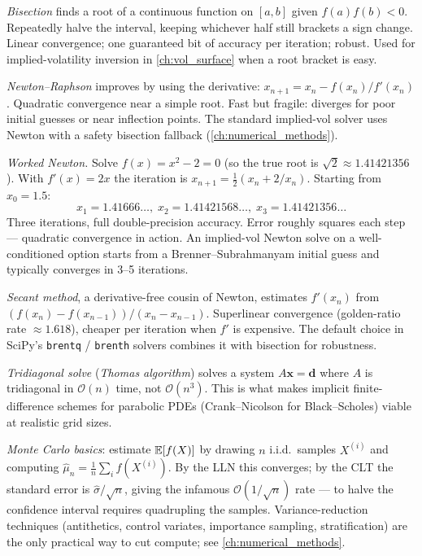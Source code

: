 \emph{Bisection} finds a root of a continuous function on $[a, b]$
given $f(a)f(b) < 0$. Repeatedly halve the interval, keeping whichever
half still brackets a sign change. Linear convergence; one guaranteed
bit of accuracy per iteration; robust. Used for implied-volatility
inversion in \cref{ch:vol_surface} when a root bracket is easy.

\emph{Newton--Raphson} improves by using the derivative:
$x_{n+1} = x_n - f(x_n) / f'(x_n)$. Quadratic convergence near a simple
root. Fast but fragile: diverges for poor initial guesses or near
inflection points. The standard implied-vol solver uses Newton with a
safety bisection fallback (\cref{ch:numerical_methods}).

\emph{Worked Newton.} Solve $f(x) = x^2 - 2 = 0$ (so the true root is
$\sqrt{2} \approx 1.41421356$). With $f'(x) = 2x$ the iteration is
$x_{n+1} = \tfrac{1}{2}(x_n + 2/x_n)$. Starting from $x_0 = 1.5$:
\[
x_1 = 1.41666\ldots,\; x_2 = 1.41421568\ldots,\; x_3 = 1.41421356\ldots
\]
Three iterations, full double-precision accuracy. Error roughly squares
each step --- quadratic convergence in action. An implied-vol
Newton solve on a well-conditioned option starts from a Brenner--Subrahmanyam
initial guess and typically converges in 3--5 iterations.

\emph{Secant method}, a derivative-free cousin of Newton, estimates
$f'(x_n)$ from $(f(x_n) - f(x_{n-1}))/(x_n - x_{n-1})$. Superlinear
convergence (golden-ratio rate $\approx 1.618$), cheaper per iteration
when $f'$ is expensive. The default choice in SciPy's
\verb|brentq| / \verb|brenth| solvers combines it with bisection for
robustness.

\emph{Tridiagonal solve} (\emph{Thomas algorithm}) solves a system
$A\bm{x} = \bm{d}$ where $A$ is tridiagonal in $\mathcal{O}(n)$ time,
not $\mathcal{O}(n^3)$. This is what makes implicit finite-difference
schemes for parabolic PDEs (Crank--Nicolson for Black--Scholes) viable
at realistic grid sizes.

\emph{Monte Carlo basics}: estimate $\mathbb{E}[f(X)]$ by drawing $n$ i.i.d.\
samples $X^{(i)}$ and computing $\hat \mu_n = \frac{1}{n}\sum_i f(X^{(i)})$.
By the LLN this converges; by the CLT the standard error is
$\hat\sigma / \sqrt{n}$, giving the infamous
$\mathcal{O}(1/\sqrt{n})$ rate --- to halve the confidence interval
requires quadrupling the samples. Variance-reduction techniques
(antithetics, control variates, importance sampling, stratification)
are the only practical way to cut compute; see
\cref{ch:numerical_methods}.

